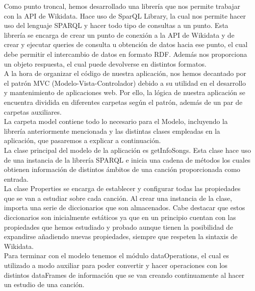 Como punto troncal, hemos desarrollado una librería que nos permite trabajar con la API de Wikidata. Hace uso de SparQL Library, la cual nos permite hacer uso del lenguaje SPARQL y hacer todo tipo de consultas a un punto. Esta librería se encarga de crear un punto de conexión a la API de Wikidata y de crear y ejecutar queries de consulta u obtención de datos hacia ese punto, el cual debe permitir el intercambio de datos en formato RDF. Además nos proporciona un objeto respuesta, el cual puede devolverse en distintos formatos.\\

A la hora de organizar el código de nuestra aplicación, nos hemos decantado por el patrón MVC (Modelo-Vista-Controlador) debido a su utilidad en el desarrollo y mantenimiento de aplicaciones web. Por ello, la lógica de nuestra aplicación se encuentra dividida en diferentes carpetas según el patrón, además de un par de carpetas auxiliares.\\

La carpeta model contiene todo lo necesario para el Modelo, incluyendo la librería anteriormente mencionada y las distintas clases empleadas en la aplicación, que pasaremos a explicar a continuación.\\

La clase principal del modelo de la aplicación es getInfoSongs. Esta clase hace uso de una instancia de la librería SPARQL e inicia una cadena de métodos los cuales obtienen información de distintos ámbitos de una canción proporcionada como entrada.\\

La clase Properties se encarga de establecer y configurar todas las propiedades que se van a estudiar sobre cada canción. Al crear una instancia de la clase, importa una serie de diccionarios que son almacenados. Cabe destacar que estos diccionarios son inicialmente estáticos ya que en un principio cuentan con las propiedades que hemos estudiado y probado aunque tienen la posibilidad de expandirse añadiendo nuevas propiedades, siempre que respeten la sintaxis de Wikidata. \\

Para terminar con el modelo tenemos el módulo dataOperations, el cual es utilizado a modo auxiliar para poder convertir y hacer operaciones con los distintos dataFrames de información que se van creando continuamente al hacer un estudio de una canción.\\

